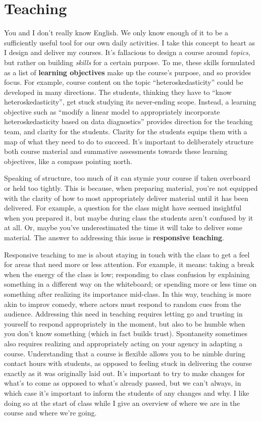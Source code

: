 \documentclass[]{book}
\begin{document}
\hypertarget{teaching}{%
\section{Teaching}\label{teaching}}

You and I don't really know English. We only know enough of it to be a sufficiently useful tool for our own daily activities. I take this concept to heart as I design and deliver my courses. It's fallacious to design a course around \emph{topics}, but rather on building \emph{skills} for a certain purpose. To me, these skills formulated as a list of \textbf{learning objectives} make up the course's purpose, and so provides focus. For example, course content on the topic ``heteroskedasticity'' could be developed in many directions. The students, thinking they have to ``know heteroskedasticity'', get stuck studying its never-ending scope. Instead, a learning objective such as ``modify a linear model to appropriately incorporate heteroskedasticity based on data diagnostics'' provides direction for the teaching team, and clarity for the students. Clarity for the students equips them with a map of what they need to do to succeed. It's important to deliberately structure both course material and summative assessments towards these learning objectives, like a compass pointing north.

Speaking of structure, too much of it can stymie your course if taken overboard or held too tightly. This is because, when preparing material, you're not equipped with the clarity of how to most appropriately deliver material until it has been delivered. For example, a question for the class might have seemed insightful when you prepared it, but maybe during class the students aren't confused by it at all. Or, maybe you've underestimated the time it will take to deliver some material. The answer to addressing this issue is \textbf{responsive teaching}.

Responsive teaching to me is about staying in touch with the class to get a feel for areas that need more or less attention. For example, it means: taking a break when the energy of the class is low; responding to class confusion by explaining something in a different way on the whiteboard; or spending more or less time on something after realizing its importance mid-class. In this way, teaching is more akin to improv comedy, where actors must respond to random cues from the audience. Addressing this need in teaching requires letting go and trusting in yourself to respond appropriately in the moment, but also to be humble when you don't know something (which in fact builds trust). Spontaneity sometimes also requires realizing and appropriately acting on your agency in adapting a course. Understanding that a course is flexible allows you to be nimble during contact hours with students, as opposed to feeling stuck in delivering the course exactly as it was originally laid out. It's important to try to make changes for what's to come as opposed to what's already passed, but we can't always, in which case it's important to inform the students of any changes and why. I like doing so at the start of class while I give an overview of where we are in the course and where we're going.
\end{document}
